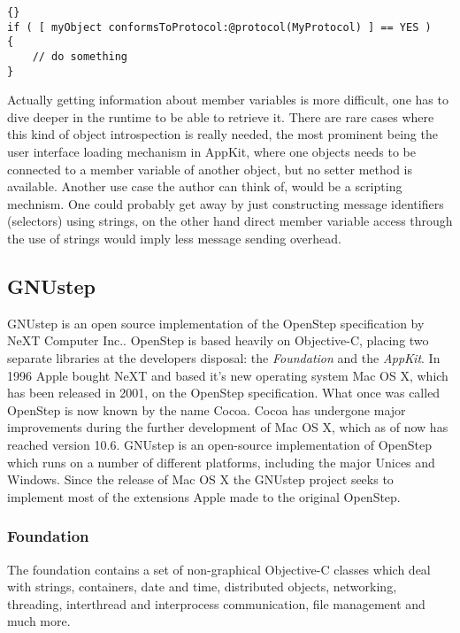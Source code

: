 \begin{lstlisting}[captionpos=b, caption=Check if an object implements a
specific protocol.,
label=lst_objcinstanceimplementsprotocol]{}
if ( [ myObject conformsToProtocol:@protocol(MyProtocol) ] == YES )
{
    // do something
}
\end{lstlisting}

Actually getting information about member variables is more difficult, one has
to dive deeper in the runtime to be able to retrieve it. There are rare cases
where this kind of object introspection is really needed, the most prominent
being the user interface loading mechanism in AppKit, where one objects needs
to be connected to a member variable of another object, but no setter method is
available. Another use case the author can think of, would be a scripting
mechnism. One could probably get away by just constructing message identifiers
(selectors) using strings, on the other hand direct member variable access
through the use of strings would imply less message sending overhead.

\subsection{GNUstep}
GNUstep is an open source implementation of the OpenStep
specification\cite{misc:OpenStepSpec} by NeXT Computer Inc.\cite{misc:NeXT}.
OpenStep is based heavily on Objective-C, placing two separate libraries at
the developers disposal: the \textit{Foundation} and the \textit{AppKit}. In
1996 Apple bought NeXT and based it's new operating system Mac OS X, which has
been released in 2001, on the OpenStep specification. What once was called
OpenStep is now known by the name Cocoa. Cocoa has undergone major improvements
during the further development of Mac OS X, which as of now has reached version
10.6. GNUstep is an open-source implementation of OpenStep which runs on a
number of different platforms, including the major Unices and Windows. Since
the release of Mac OS X the GNUstep project seeks to implement most of the
extensions Apple made to the original OpenStep.

\subsubsection{Foundation}

The foundation contains a set of non-graphical Objective-C classes which deal
with strings, containers, date and time, distributed objects, networking,
threading,  interthread and interprocess communication, file management and
much more.

